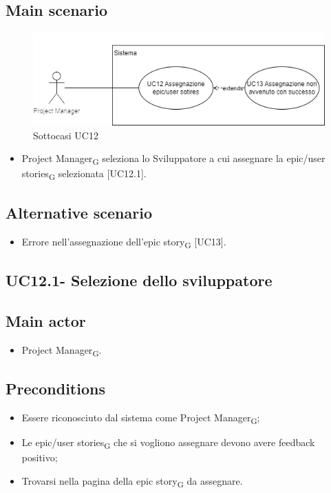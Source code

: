 \documentclass{article}
\begin{document}
    \subsection*{Main scenario}
        \begin{figure}[h]
          \centering
          \includegraphics{./imgUML/UC12-zoom.png}
          \caption{Sottocasi UC12}
          \label{fig:UC12_sottocasi}
        \end{figure}
        
        \begin{itemize}
            \item Project Manager\textsubscript{G} seleziona lo Sviluppatore a cui assegnare la epic/user stories\textsubscript{G} selezionata [UC12.1].
        \end{itemize}
        
    \subsection*{Alternative scenario}
        \begin{itemize}
            \item Errore nell'assegnazione dell'epic story\textsubscript{G} [UC13].
        \end{itemize}    
        
    \subsection{UC12.1- Selezione dello sviluppatore}
        \subsection*{Main actor}
    \begin{itemize}
        \item Project Manager\textsubscript{G}.
    \end{itemize}
    
    \subsection*{Preconditions}
        \begin{itemize}
            \item Essere riconosciuto dal sistema come Project Manager\textsubscript{G};
            \item Le epic/user stories\textsubscript{G} che si vogliono assegnare devono avere feedback positivo;
            \item Trovarsi nella pagina della epic story\textsubscript{G} da assegnare.
        \end{itemize}
        
\end{document}

